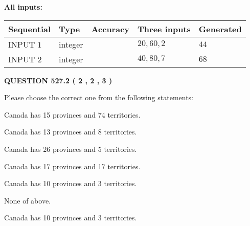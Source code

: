 \documentclass[12pt]{article}
\begin{document}
   
   
   
\noindent{}
   
   
   
   
\noindent\vspace{0.1in}\hspace{-0.08in} {\textbf{\Large{All inputs: }}}
   
   
  
  
\noindent\begin{tabular}{|l|l|l|l|l|}
\hline
 Sequential & Type & Accuracy & Three inputs & Generated \\ 
\hline
 
 
  INPUT $  1 $ & integer &  & $
 20
 , 
 60
 , 
 2
 $ & $ 44 $ 
 \\  \hline  
 
 
  INPUT $  2 $ & integer &  & $
 40
 , 
 80
 , 
 7
 $ & $ 68 $ 
 \\  \hline  
 \end{tabular}
   
   
  
\vspace{0.2in}
  
{\textbf{\Large{QUESTION
527.2 
 ( 2 , 2 , 3 )
}}}
  
  
Please choose the correct one from the following statements:
 
 
Canada has  15 provinces and  74 territories.
 
 
Canada has  13 provinces and  8 territories.
 
 
Canada has  26 provinces and  5 territories.
 
 
Canada has  17 provinces and  17 territories.
 
 
Canada has 10  provinces and 3 territories.
 
 
 None of above.
 
 
\noindent{}
 
 
Canada has 10  provinces and 3 territories.
 
 
\noindent{}
 
 
   
\end{document}
